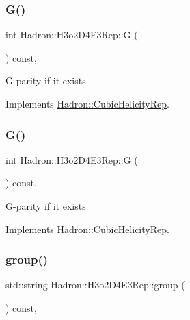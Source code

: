 \subsubsection{\texorpdfstring{G()}{G()}\hspace{0.1cm}{\footnotesize\ttfamily [1/2]}}
{\footnotesize\ttfamily int Hadron\+::\+H3o2\+D4\+E3\+Rep\+::G (\begin{DoxyParamCaption}{ }\end{DoxyParamCaption}) const\hspace{0.3cm}{\ttfamily [inline]}, {\ttfamily [virtual]}}

G-\/parity if it exists 

Implements \mbox{\hyperlink{structHadron_1_1CubicHelicityRep_a50689f42be1e6170aa8cf6ad0597018b}{Hadron\+::\+Cubic\+Helicity\+Rep}}.

\mbox{\label{structHadron_1_1H3o2D4E3Rep_a02908f3ed8b795cdacd78ceea2b11ad1}} 
\subsubsection{\texorpdfstring{G()}{G()}\hspace{0.1cm}{\footnotesize\ttfamily [2/2]}}
{\footnotesize\ttfamily int Hadron\+::\+H3o2\+D4\+E3\+Rep\+::G (\begin{DoxyParamCaption}{ }\end{DoxyParamCaption}) const\hspace{0.3cm}{\ttfamily [inline]}, {\ttfamily [virtual]}}

G-\/parity if it exists 

Implements \mbox{\hyperlink{structHadron_1_1CubicHelicityRep_a50689f42be1e6170aa8cf6ad0597018b}{Hadron\+::\+Cubic\+Helicity\+Rep}}.

\mbox{\label{structHadron_1_1H3o2D4E3Rep_acfb5a306823b56f4e03d1c7f818de23c}} 
\subsubsection{\texorpdfstring{group()}{group()}\hspace{0.1cm}{\footnotesize\ttfamily [1/3]}}
{\footnotesize\ttfamily std\+::string Hadron\+::\+H3o2\+D4\+E3\+Rep\+::group (\begin{DoxyParamCaption}{ }\end{DoxyParamCaption}) const\hspace{0.3cm}{\ttfamily [inline]}, {\ttfamily [virtual]}}


